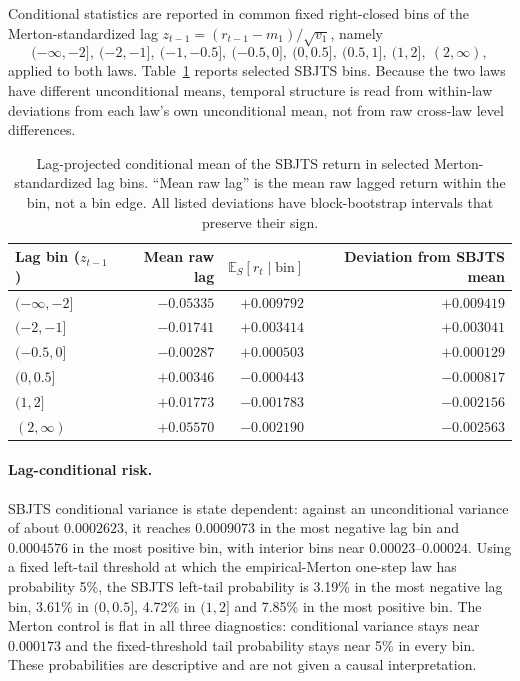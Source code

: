 \documentclass[11pt]{article}
\newcommand{\E}{\mathbb E}
\begin{document}
Conditional statistics are reported in common fixed right-closed bins of the Merton-standardized lag $z_{t-1}=(r_{t-1}-m_1)/\sqrt{v_1}$, namely
\[
(-\infty,-2],\ (-2,-1],\ (-1,-0.5],\ (-0.5,0],\ (0,0.5],\ (0.5,1],\ (1,2],\ (2,\infty),
\]
applied to both laws. Table~\ref{tab:condmean} reports selected SBJTS bins. Because the two laws have different unconditional means, temporal structure is read from within-law deviations from each law's own unconditional mean, not from raw cross-law level differences.

\begin{table}[htbp]
\centering
\caption{Lag-projected conditional mean of the SBJTS return in selected Merton-standardized lag bins. ``Mean raw lag'' is the mean raw lagged return within the bin, not a bin edge. All listed deviations have block-bootstrap intervals that preserve their sign.}
\label{tab:condmean}
\begin{tabular}{@{}lrrr@{}}
\toprule
Lag bin ($z_{t-1}$) & Mean raw lag & $\E_S[r_t\mid\text{bin}]$ & Deviation from SBJTS mean\\
\midrule
$(-\infty,-2]$ & $-0.05335$ & $+0.009792$ & $+0.009419$\\
$(-2,-1]$ & $-0.01741$ & $+0.003414$ & $+0.003041$\\
$(-0.5,0]$ & $-0.00287$ & $+0.000503$ & $+0.000129$\\
$(0,0.5]$ & $+0.00346$ & $-0.000443$ & $-0.000817$\\
$(1,2]$ & $+0.01773$ & $-0.001783$ & $-0.002156$\\
$(2,\infty)$ & $+0.05570$ & $-0.002190$ & $-0.002563$\\
\bottomrule
\end{tabular}
\end{table}

\paragraph{Lag-conditional risk.} SBJTS conditional variance is state dependent: against an unconditional variance of about $0.0002623$, it reaches $0.0009073$ in the most negative lag bin and $0.0004576$ in the most positive bin, with interior bins near $0.00023$--$0.00024$. Using a fixed left-tail threshold at which the empirical-Merton one-step law has probability 5\%, the SBJTS left-tail probability is 3.19\% in the most negative lag bin, 3.61\% in $(0,0.5]$, 4.72\% in $(1,2]$ and 7.85\% in the most positive bin. The Merton control is flat in all three diagnostics: conditional variance stays near $0.000173$ and the fixed-threshold tail probability stays near 5\% in every bin. These probabilities are descriptive and are not given a causal interpretation.
\end{document}

